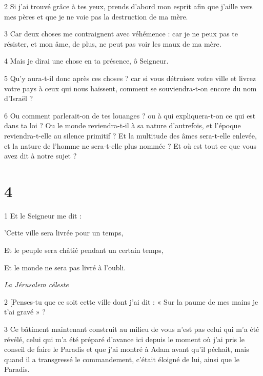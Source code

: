 \par 2 Si j'ai trouvé grâce à tes yeux, prends d'abord mon esprit afin que j'aille vers mes pères et que je ne voie pas la destruction de ma mère.

\par 3 Car deux choses me contraignent avec véhémence : car je ne peux pas te résister, et mon âme, de plus, ne peut pas voir les maux de ma mère.

\par 4 Mais je dirai une chose en ta présence, ô Seigneur.

\par 5 Qu'y aura-t-il donc après ces choses ? car si vous détruisez votre ville et livrez votre pays à ceux qui nous haïssent, comment se souviendra-t-on encore du nom d'Israël ?

\par 6 Ou comment parlerait-on de tes louanges ? ou à qui expliquera-t-on ce qui est dans ta loi ? Ou le monde reviendra-t-il à sa nature d’autrefois, et l’époque reviendra-t-elle au silence primitif ? Et la multitude des âmes sera-t-elle enlevée, et la nature de l'homme ne sera-t-elle plus nommée ? Et où est tout ce que vous avez dit à notre sujet ?

\chapter{4}

\par 1 Et le Seigneur me dit :

\par 'Cette ville sera livrée pour un temps,

\par Et le peuple sera châtié pendant un certain temps,

\par Et le monde ne sera pas livré à l'oubli.

\par \textit{La Jérusalem céleste}

\par 2 [Penses-tu que ce soit cette ville dont j'ai dit : « Sur la paume de mes mains je t'ai gravé » ?

\par 3 Ce bâtiment maintenant construit au milieu de vous n'est pas celui qui m'a été révélé, celui qui m'a été préparé d'avance ici depuis le moment où j'ai pris le conseil de faire le Paradis et que j'ai montré à Adam avant qu'il péchait, mais quand il a transgressé le commandement, c'était éloigné de lui, ainsi que le Paradis.

